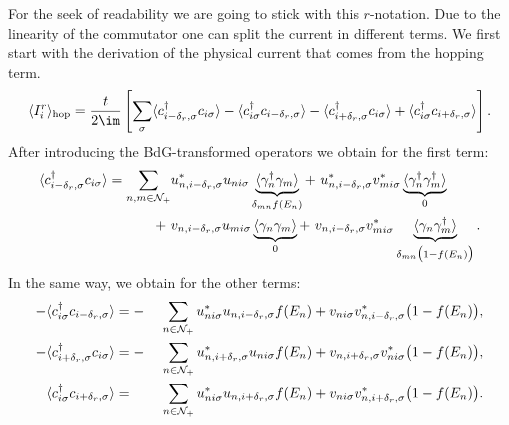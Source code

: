 \documentclass[../main.tex]{subfile}
\begin{document}
For the seek of readability we are going to stick with this $r$-notation.
Due to the linearity of the commutator one can split the current in different terms. We first start with the derivation of the physical current
that comes from the hopping term.
\begin{equation*}
    \begin{aligned}
    \langle I_i^r\rangle_{\text{hop}} = \frac{t}{2\im}\left[ \sum_{\sigma} 
        \langle c_{i-\delta_{r},\sigma}^{\dagger} c_{i\sigma}\rangle
        -\langle c_{i\sigma}^{\dagger}            c_{i-\delta_{r},\sigma}\rangle
        -\langle c_{i+\delta_{r},\sigma}^{\dagger} c_{i\sigma}\rangle
        +\langle c_{i\sigma}^{\dagger}            c_{i+\delta_{r},\sigma}\rangle\right].
\end{aligned}
\end{equation*}
After introducing the BdG-transformed operators we obtain for the first term:
\begin{equation*}
    \begin{aligned}
        \color{TamGreen}{\langle c_{i-\delta_r,\sigma}^{\dagger} c_{i\sigma}\rangle} \color{black}= \sum_{n,m\in\mathcal{N}_+} 
        &u_{n,i-\delta_r,\sigma}^{\ast} u_{ni\sigma} \underbrace{\langle \gamma_n^{\dagger}\gamma_m\rangle}_{\delta_{mn}f(E_n)} 
        +~ u_{n,i-\delta_r,\sigma}^{\ast} v_{mi\sigma}^{\ast} \underbrace{\langle \gamma_n^{\dagger}\gamma_m^{\dagger}\rangle}_{0}\\
        +~& v_{n,i-\delta_r,\sigma}u_{mi\sigma}\underbrace{\langle \gamma_n\gamma_m\rangle}_{0}
        +~ v_{n,i-\delta_r,\sigma}v_{mi\sigma}^{\ast}\underbrace{\langle \gamma_n\gamma_m^{\dagger}\rangle}_{\delta_{mn}\bigl(1-f(E_n)\bigr)}.
    \end{aligned}
\end{equation*}
In the same way, we obtain for the other terms:
\begin{alignat*}{2}
    -\color{TamGreen}{\langle c_{i\sigma}^{\dagger}c_{i-\delta_{r},\sigma}\rangle} &= -&\sum_{n\in\mathcal{N}_+} u_{ni\sigma}^{\ast}u_{n,i-\delta_r,\sigma} f(E_n) + v_{ni\sigma}v_{n,i-\delta_r,\sigma}^{\ast}\bigl(1-f(E_n)\bigr),\\
    -\color{TamTangerine}{\langle c_{i+\delta_{r},\sigma}^{\dagger}c_{i\sigma}\rangle} &= -&\sum_{n\in\mathcal{N}_+} u_{n,i+\delta_r,\sigma}^{\ast}u_{ni\sigma} f(E_n) + v_{n,i+\delta_r,\sigma}v_{ni\sigma}^{\ast}\bigl(1-f(E_n)\bigr),\\
    \color{TamTangerine}{\langle c_{i\sigma}^{\dagger}c_{i+\delta_{r},\sigma}\rangle} &=  &~\sum_{n\in\mathcal{N}_+} u_{ni\sigma}^{\ast}u_{n,i+\delta_r,\sigma} f(E_n) + v_{ni\sigma}v_{n,i+\delta_r,\sigma}^{\ast}\bigl(1-f(E_n)\bigr).
\end{alignat*}
\end{document}
